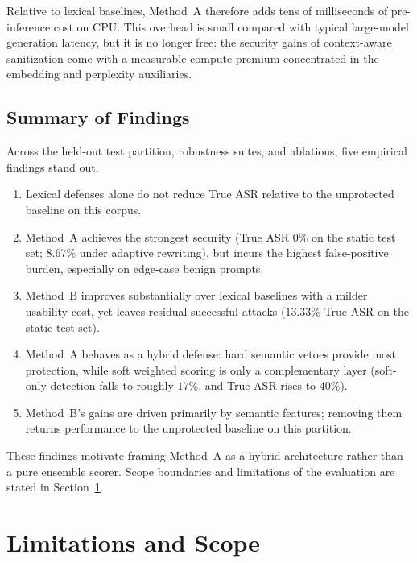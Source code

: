 \documentclass{article}
\begin{document}
Relative to lexical baselines, Method~A therefore adds tens of milliseconds of pre-inference cost on CPU.
This overhead is small compared with typical large-model generation latency, but it is no longer free: the security gains of context-aware sanitization come with a measurable compute premium concentrated in the embedding and perplexity auxiliaries.

\subsection{Summary of Findings}
\label{sec:results-summary}

Across the held-out test partition, robustness suites, and ablations, five empirical findings stand out.
\begin{enumerate}
  \item Lexical defenses alone do not reduce True ASR relative to the unprotected baseline on this corpus.
  \item Method~A achieves the strongest security (True ASR \(0\%\) on the static test set; \(8.67\%\) under adaptive rewriting), but incurs the highest false-positive burden, especially on edge-case benign prompts.
  \item Method~B improves substantially over lexical baselines with a milder usability cost, yet leaves residual successful attacks (\(13.33\%\) True ASR on the static test set).
  \item Method~A behaves as a hybrid defense: hard semantic vetoes provide most protection, while soft weighted scoring is only a complementary layer (soft-only detection falls to roughly \(17\%\), and True ASR rises to \(40\%\)).
  \item Method~B's gains are driven primarily by semantic features; removing them returns performance to the unprotected baseline on this partition.
\end{enumerate}
These findings motivate framing Method~A as a hybrid architecture rather than a pure ensemble scorer.
Scope boundaries and limitations of the evaluation are stated in Section~\ref{sec:limitations}.



\section{Limitations and Scope}
\label{sec:limitations}
\end{document}
